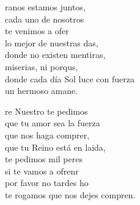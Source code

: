 \begin{cancion}%
	ranos estamos juntos,\\
	\jump
cada uno de nosotros \\
	te venimos a ofer\\
	lo mejor de nuestras das,\\
	\jump
donde no existen mentiras, \\
	miserias, ni porqus,\\
	donde cada día Sol luce con fuerza\\
	un hermoso amane.\jump\\
	\begin{chorus}%
		re Nuestro te pedimos\\
	\jump
	que tu amor sea la fuerza\\
		que nos haga comprer,\\
		que tu Reino está en laida,\\
		te pedimos mil peres\\
		si te vamos a ofrenr\\
		por favor no tardes ho \\
		te rogamos que nos dejes compren.\jump\\
	\end{chorus}%
\end{cancion}%

